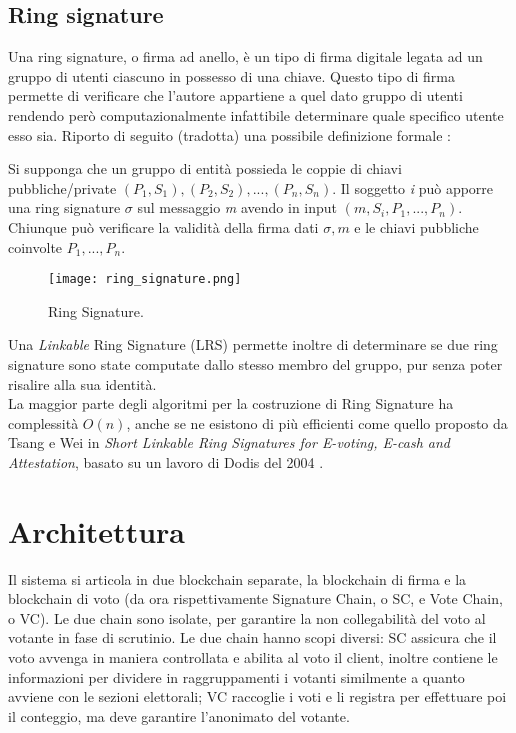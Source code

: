 	\subsection{Ring signature}
		Una ring signature, o firma ad anello, è un tipo di firma digitale legata ad un gruppo di utenti ciascuno in possesso di una chiave. Questo tipo di firma permette di verificare che l'autore appartiene a quel dato gruppo di utenti rendendo però computazionalmente infattibile determinare quale specifico utente esso sia. Riporto di seguito (tradotta) una possibile definizione formale \cite{ring_signature}: 
		\begin{displayquote}
			Si supponga che un gruppo di entità possieda le coppie di chiavi pubbliche/private $(P_1, S_1), (P_2, S_2), ..., (P_n, S_n)$. Il soggetto \emph{i} può apporre una ring signature $\sigma$ sul messaggio \emph{m} avendo in input $(m, S_i, P_1, ..., P_n)$. Chiunque può verificare la validità della firma dati $\sigma, m$ e le chiavi pubbliche coinvolte $P_1, ..., P_n$.
		\end{displayquote}
		\begin{figure}[ht]
			\centering
			\texttt{[image: ring\_signature.png]}
			\caption[Ring Signature]{Ring Signature.}
			\label{fig:ring_signature}
		\end{figure}
		Una \emph{Linkable} Ring Signature (LRS) permette inoltre di determinare se due ring signature sono state computate dallo stesso membro del gruppo, pur senza poter risalire alla sua identità. \\
		La maggior parte degli algoritmi per la costruzione di Ring Signature ha complessità $O(n)$, anche se ne esistono di più efficienti come quello proposto da Tsang e Wei in \emph{Short Linkable Ring Signatures for E-voting, E-cash and Attestation}\cite{SLRS}, basato su un lavoro di Dodis del 2004 \cite{dodis}.

\section{Architettura}
	Il sistema si articola in due blockchain separate, la blockchain di firma e la blockchain di voto (da ora rispettivamente Signature Chain, o SC, e Vote Chain, o VC). Le due chain sono isolate, per garantire la non collegabilità del voto al votante in fase di scrutinio.
	Le due chain hanno scopi diversi: SC assicura che il voto avvenga in maniera controllata e abilita al voto il client, inoltre contiene le informazioni per dividere in raggruppamenti i votanti similmente a quanto avviene con le sezioni elettorali; VC raccoglie i voti e li registra per effettuare poi il conteggio, ma deve garantire l’anonimato del votante.
	
